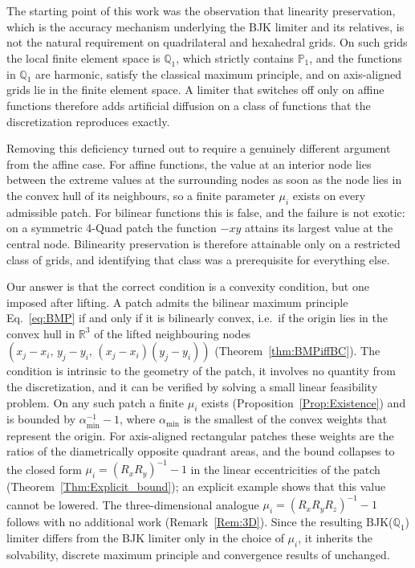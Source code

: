\documentclass[a4paper]{article}
\newcommand{\R}{\mathbb{R}}
\theoremstyle{plain}
\theoremstyle{definition}
\theoremstyle{remark}
\begin{document}
The starting point of this work was the observation that linearity preservation, which
is the accuracy mechanism underlying the BJK limiter and its relatives, is not the
natural requirement on quadrilateral and hexahedral grids. On such grids the local
finite element space is $\mathbb{Q}_1$, which strictly contains $\mathbb{P}_1$, and the functions in
$\mathbb{Q}_1  $ are harmonic, satisfy the classical maximum principle, and on
axis-aligned grids lie in the finite element space. A limiter that switches off only
on affine functions therefore adds artificial diffusion on a class of functions that
the discretization reproduces exactly.

Removing this deficiency turned out to require a genuinely different argument from the
affine case. For affine functions, the value at an interior node lies between the
extreme values at the surrounding nodes as soon as the node lies in the convex hull of
its neighbours, so a finite parameter $\mu_i$ exists on every admissible patch. For
bilinear functions this is false, and the failure is not exotic: on a symmetric
4-Quad patch the function $-xy$ attains its largest value at the central
node. Bilinearity preservation is therefore attainable only on a restricted class of
grids, and identifying that class was a prerequisite for everything else.

Our answer is that the correct condition is a convexity condition, but one imposed
after lifting. A patch admits the bilinear maximum principle Eq.~\eqref{eq:BMP} if and only
if it is bilinearly convex, i.e.\ if the origin lies in the convex hull in $\R^3$ of
the lifted neighbouring nodes $(x_j - x_i,\, y_j - y_i,\, (x_j - x_i)(y_j - y_i))$
(Theorem~\ref{thm:BMPiffBC}). The condition is intrinsic to the geometry of the patch,
it involves no quantity from the discretization, and it can be verified by solving a
small linear feasibility problem. On any such patch a finite $\mu_i$ exists
(Proposition~\ref{Prop:Existence}) and is bounded by $\alpha_{\min}^{-1} - 1$, where
$\alpha_{\min}$ is the smallest of the convex weights that represent the origin. For
axis-aligned rectangular patches these weights are the ratios of the diametrically
opposite quadrant areas, and the bound collapses to the closed form
$\mu_i = (R_xR_y)^{-1} - 1$ in the linear eccentricities of the patch
(Theorem~\ref{Thm:Explicit_bound}); an explicit example shows that this value cannot be
lowered. The three-dimensional analogue $\mu_i = (R_xR_yR_z)^{-1} - 1$ follows with no
additional work (Remark~\ref{Rem:3D}). Since the resulting BJK($\mathbb{Q}_1$) limiter differs from the
BJK limiter only in the choice of $\mu_i$, it inherits the solvability, discrete
maximum principle and convergence results of \cite{BJK25} unchanged.
\end{document}
